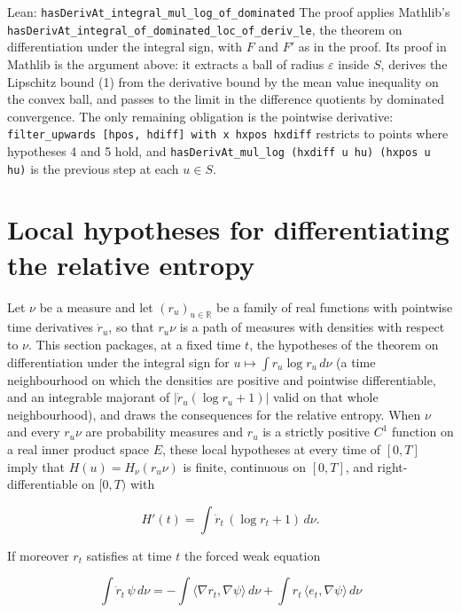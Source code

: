 \documentclass[11pt,a4paper]{report}
\begin{document}
\begin{leanbox}{Lean: \texttt{hasDerivAt\_\allowbreak{}integral\_\allowbreak{}mul\_\allowbreak{}log\_\allowbreak{}of\_\allowbreak{}dominated}}
The proof applies Mathlib's \texttt{has\allowbreak{}Deriv\allowbreak{}At\_\allowbreak{}integral\_\allowbreak{}of\_\allowbreak{}dominated\_\allowbreak{}loc\_\allowbreak{}of\_\allowbreak{}deriv\_\allowbreak{}le}, the theorem on differentiation under the integral sign, with \(F\) and \(F'\) as in the proof. Its proof in Mathlib is the argument above: it extracts a ball of radius \(\varepsilon\) inside \(S\), derives the Lipschitz bound (1) from the derivative bound by the mean value inequality on the convex ball, and passes to the limit in the difference quotients by dominated convergence. The only remaining obligation is the pointwise derivative: \texttt{filter\_\allowbreak{}upwards [hpos, hdiff] with x hxpos hxdiff} restricts to points where hypotheses 4 and 5 hold, and \texttt{has\allowbreak{}Deriv\allowbreak{}At\_\allowbreak{}mul\_\allowbreak{}log (hxdiff u hu) (hxpos u hu)} is the previous step at each \(u\in S\).
\end{leanbox}
\section{\texorpdfstring{Local hypotheses for differentiating the relative entropy}{Local hypotheses for differentiating the relative entropy}}
\label{proof-module-UnadjustedLangevin-LSI-Regularity-lean}


Let \(\nu\) be a measure and let \((r_u)_{u\in\mathbb R}\) be a family of real functions with pointwise time derivatives \(\dot r_u\), so that \(r_u\nu\) is a path of measures with densities with respect to \(\nu\). This section packages, at a fixed time \(t\), the hypotheses of the theorem on differentiation under the integral sign for \(u\mapsto\int r_u\log r_u\,d\nu\) (a time neighbourhood on which the densities are positive and pointwise differentiable, and an integrable majorant of \(|\dot r_u(\log r_u+1)|\) valid on that whole neighbourhood), and draws the consequences for the relative entropy. When \(\nu\) and every \(r_u\nu\) are probability measures and \(r_u\) is a strictly positive \(C^1\) function on a real inner product space \(E\), these local hypotheses at every time of \([0,T]\) imply that \(H(u)=H_\nu(r_u\nu)\) is finite, continuous on \([0,T]\), and right-differentiable on \([0,T)\) with


\[H'(t)=\int\dot r_t\,(\log r_t+1)\,d\nu.\]


If moreover \(r_t\) satisfies at time \(t\) the forced weak equation


\[\int\dot r_t\,\psi\,d\nu=-\int\langle\nabla r_t,\nabla\psi\rangle\,d\nu+\int r_t\,\langle e_t,\nabla\psi\rangle\,d\nu\]
\end{document}
